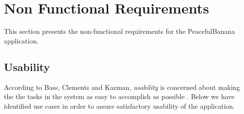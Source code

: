 \section{Non Functional Requirements}
\label{cha:nonfuncreq}
This section presents the non-functional requirements for the PeacefulBanana application. 

\subsection{Usability}
According to Bass, Clements and Kazman, \emph{usability} is concerned about making the the tasks in the system as easy to accomplish as possible \citep[p.~90]{ProgarkPensum}. Below we have identified use cases in order to assure satisfactory usability of the application.

